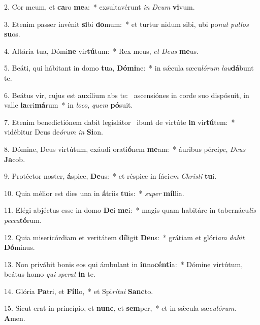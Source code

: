 2. Cor meum, et \textbf{ca}ro \textbf{me}a:~*  exsultavérunt \textit{in} \textit{De}\textit{um} \textbf{vi}vum.\

3. Etenim passer invénit \textbf{si}bi \textbf{do}mum:~*  et turtur nidum sibi, ubi po\textit{nat} \textit{pul}\textit{los} \textbf{su}os.\

4. Altária tua, Dómi\textbf{ne} vir\textbf{tú}tum:~*  Rex meus, \textit{et} \textit{De}\textit{us} \textbf{me}us.\

5. Beáti, qui hábitant in domo \textbf{tu}a, \textbf{Dó}\textbf{mi}ne:~*  in sǽcula sæcu\textit{ló}\textit{rum} \textit{lau}\textbf{dá}bunt te.\

6. Beátus vir, cujus est auxílium abs te: \dag\  ascensiónes in corde suo dispósuit, in valle \textbf{la}cri\textbf{má}rum~*  in \textit{lo}\textit{co}, \textit{quem} \textbf{pó}suit.\

7. Etenim benedictiónem dabit legislátor \dag\  ibunt de virtúte \textbf{in} vir\textbf{tú}tem:~*  vidébitur Deus de\textit{ó}\textit{rum} \textit{in} \textbf{Si}on.\

8. Dómine, Deus virtútum, exáudi orati\textbf{ó}nem \textbf{me}am:~*  áuribus pérci\textit{pe}, \textit{De}\textit{us} \textbf{Ja}cob.\

9. Protéctor noster, \textbf{á}spice, \textbf{De}us:~*  et réspice in fáci\textit{em} \textit{Chris}\textit{ti} \textbf{tu}i.\

10. Quia mélior est dies una in \textbf{á}triis \textbf{tu}is:~*  \textit{su}\textit{per} \textbf{míl}lia.\

11. Elégi abjéctus esse in domo \textbf{De}i \textbf{me}i:~*  magis quam habitáre in tabernácu\textit{lis} \textit{pec}\textit{ca}\textbf{tó}rum.\

12. Quia misericórdiam et veritátem \textbf{dí}ligit \textbf{De}us:~*  grátiam et glóri\textit{am} \textit{da}\textit{bit} \textbf{Dó}minus.\

13. Non privábit bonis eos qui ámbulant in \textbf{in}no\textbf{cén}\textbf{ti}a:~*  Dómine virtútum, beátus homo \textit{qui} \textit{spe}\textit{rat} \textbf{in} te.\

14. Glória \textbf{Pa}tri, et \textbf{Fí}\textbf{li}o,~*  et Spi\textit{rí}\textit{tu}\textit{i} \textbf{Sanc}to.\

15. Sicut erat in princípio, et \textbf{nunc}, et \textbf{sem}per,~*  et in sǽcula sæ\textit{cu}\textit{ló}\textit{rum}. \textbf{A}men.\

